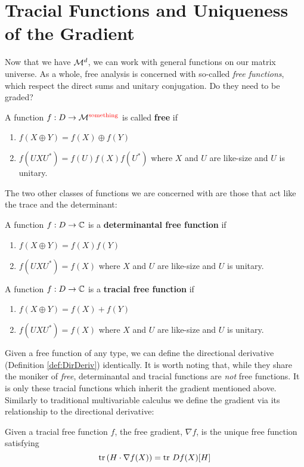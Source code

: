 \section{Tracial Functions and Uniqueness of the Gradient}%
\label{sec:TracGrad}
Now that we have \(\mathcal{M}^d\), we can work with general functions on our matrix
universe. As a whole, free analysis is concerned with so-called \emph{free
  functions}, which respect the direct sums and unitary conjugation.
{\color{red} Do they need to be graded?}
\begin{definition}
\label{def:FreeFun}
  A function \(f: D\to \mathcal{M}^{\color{red} \text{something}}\) is called \textbf{free} if
  \begin{enumerate}
    \item \(f(X\oplus Y)= f(X) \oplus f(Y)\)
    \item \(f(U X U^*) = f(U)f(X)f(U^*)\) where \(X\) and \(U\) are like-size
          and \(U\) is unitary.
  \end{enumerate}
\end{definition}

The two other classes of functions we are concerned with are those that act like
the trace and the determinant:
\begin{definition}
  \label{def:DetFreeFun}
  A function \(f: D \to \mathbb{C} \) is a \textbf{determinantal free function} if
  \begin{enumerate}
    \item \(f(X\oplus Y) = f(X)f(Y)\)
    \item \(f(U X U^*) = f(X)\) where \(X\) and \(U\) are like-size
          and \(U\) is unitary.
  \end{enumerate}
\end{definition}

\begin{definition}
  \label{def:TrFreeFun}
  A function \(f: D \to \mathbb{C} \) is a \textbf{tracial free function} if
  \begin{enumerate}
    \item \(f(X\oplus Y) = f(X)+f(Y)\)
    \item \(f(U X U^*) = f(X)\) where \(X\) and \(U\) are like-size
          and \(U\) is unitary.
  \end{enumerate}
\end{definition}

Given a free function of any type, we can define the directional derivative
(Definition \ref{def:DirDeriv}) identically. It is worth noting that, while they
share the moniker of \emph{free}, determinantal and tracial functions are
\emph{not} free functions.
It is only these tracial functions which inherit the gradient mentioned above.
Similarly to traditional multivariable calculus we define the gradient via its
relationship to the directional derivative:
\begin{definition}
\label{def:FreeGrad}
  Given a tracial free function \(f\), the free gradient, \(\nabla f\), is the
  unique free function satisfying
  \[
    \operatorname{tr} \left( H \cdot \nabla f(X) \right) = \operatorname{tr}\, Df(X)[H]
  \]
\end{definition}

